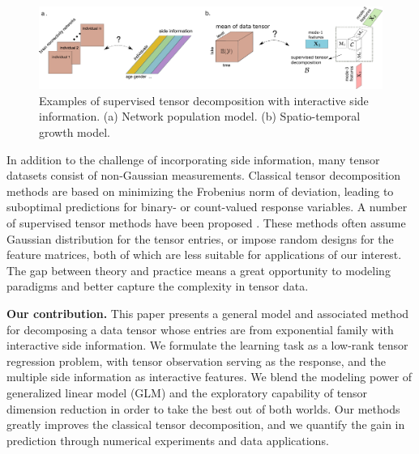 \documentclass{article}
\theoremstyle{definition}
\theoremstyle{definition}
\begin{document}
 \begin{figure}[hbt]
 \vspace{-.4cm}
\begin{center}
\includegraphics[width = 13.5cm]{demo.pdf}
\vspace{-.4cm}
\end{center}
\caption{Examples of supervised tensor decomposition with interactive side information. (a) Network population model. (b) Spatio-temporal growth model.} \label{fig:intro1}
\vspace{-.2cm}
\end{figure}

In addition to the challenge of incorporating side information, many tensor datasets consist of non-Gaussian measurements. Classical tensor decomposition methods are based on minimizing the Frobenius norm of deviation, leading to suboptimal predictions for binary- or count-valued response variables. A number of supervised tensor methods have been proposed \citep{narita2012tensor, zhao2012higher, yu2016learning,lock2018supervised}. These methods often assume Gaussian distribution for the tensor entries, or impose random designs for the feature matrices, both of which are less suitable for applications of our interest. The gap between theory and practice means a great opportunity to modeling paradigms and better capture the complexity in tensor data. 

{\bf Our contribution.} This paper presents a general model and associated method for decomposing a data tensor whose entries are from exponential family with interactive side information. We formulate the learning task as a low-rank tensor regression problem, with tensor observation serving as the response, and the multiple side information as interactive features. We blend the modeling power of generalized linear model (GLM) and the exploratory capability of tensor dimension reduction in order to take the best out of both worlds. Our methods greatly improves the classical tensor decomposition, and we quantify the gain in prediction through numerical experiments and data applications. 
\end{document}
